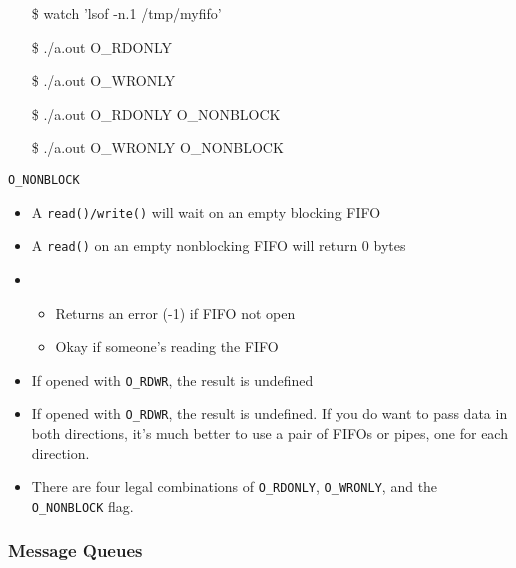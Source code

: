\begin{frame}{}{}
  {\ttfamily
    \begin{itemize}
    \item[\$] watch 'lsof -n.1 /tmp/myfifo'
    \item[\$] ./a.out O\_RDONLY
    \item[\$] ./a.out O\_WRONLY
    \item[\$] ./a.out O\_RDONLY O\_NONBLOCK
    \item[\$] ./a.out O\_WRONLY O\_NONBLOCK
    \end{itemize}}
  \begin{block}{\texttt{O\_NONBLOCK}}
    \begin{itemize}
    \item A \texttt{read()/write()} will wait on an empty blocking FIFO
    \item A \texttt{read()} on an empty nonblocking FIFO will return 0 bytes
    \item {}
      \begin{itemize}
      \item Returns an error (-1) if FIFO not open
      \item Okay if someone's reading the FIFO
      \end{itemize}
    \item If opened with \texttt{O\_RDWR}, the result is undefined
    \end{itemize}
  \end{block}
\end{frame}

\begin{itemize}
\item If opened with \texttt{O\_RDWR}, the result is undefined. If you do want to pass
  data in both directions, it's much better to use a pair of FIFOs or pipes, one for each
  direction.
\item There are four legal combinations of \texttt{O\_RDONLY}, \texttt{O\_WRONLY}, and the
  \texttt{O\_NONBLOCK} flag. 
\end{itemize}
\begin{longlisting}
\end{longlisting}

\subsubsection{Message Queues}
\label{sec:message-queues}

